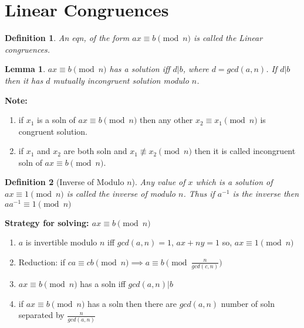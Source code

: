 \documentclass[12pt,a4paper]{article}
\newtheorem{defn}{Definition}
\newtheorem{lem}{Lemma}
\begin{document}
\section{Linear Congruences}
\begin{defn}
	An eqn, of the form $ax\equiv b \pmod n$ is called the Linear congruences.
\end{defn}
\begin{lem}
	$ax \equiv b \pmod n$ has a solution iff $d|b$, where $d=gcd(a,n)$. If $d|b$ then it has $d$ mutually incongruent solution modulo $n$.
\end{lem}
\textbf{Note: }
\begin{enumerate}
	\item if $x_{1}$ is a soln of $ax \equiv b \pmod n$ then any other $x_{2} \equiv x_{1}  \pmod n$ is congruent solution.
	\item if $x_{1}$ and $x_{2}$ are both soln and  $x_{1} \not \equiv x_{2}  \pmod n$ then it is called incongruent soln of $ax \equiv b \pmod n$.
\end{enumerate}

\begin{defn}[Inverse of Modulo $n$]
Any value of $x$ which is a solution of $ax \equiv 1 \pmod n$ is called the inverse of modulo $n$. Thus if $a^{-1}$ is the inverse then $aa^{-1} \equiv 1 \pmod n$
\end{defn}

\textbf{Strategy for solving: $ax \equiv b \pmod n$}
\begin{enumerate}
	\item $a$ is invertible modulo $n$ iff $gcd(a,n)=1$, $ax+ny=1$ so, $ax\equiv 1 \pmod n$
	\item Reduction: if $ca\equiv cb \pmod n \implies a \equiv b \pmod {\frac{n}{gcd(c,n)}}$
	\item $ax \equiv b \pmod n$ has a soln iff $gcd(a,n)|b$
	\item if $ax \equiv b \pmod n$ has a soln then there are $gcd(a,n)$ number of soln separated by $\frac{n}{gcd(a,n)}$
\end{enumerate}
\end{document}
